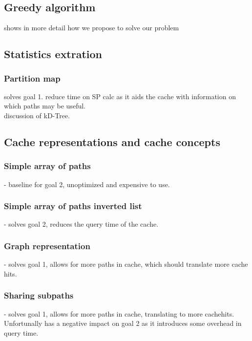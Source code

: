 \subsection{Greedy algorithm}
shows in more detail how we propose to solve our problem


\subsection{Statistics extration}

\subsubsection{Partition map} 
solves goal 1. reduce time on SP calc as it aids the cache with information on which paths may be useful.\\ 
discussion of kD-Tree.


\subsection{Cache representations and cache concepts} 

\subsubsection{Simple array of paths} - baseline for goal 2, unoptimized and expensive to use.

\subsubsection{Simple array of paths inverted list} - solves goal 2, reduces the query time of the cache.

\subsubsection{Graph representation} - solves goal 1, allows for more paths in cache, which should translate more cache hits.

\subsubsection{Sharing subpaths} - solves goal 1, allows for more paths in cache, translating to more cachehits. Unfortunally has a negative impact on goal 2 as it introduces some overhead in query time.

